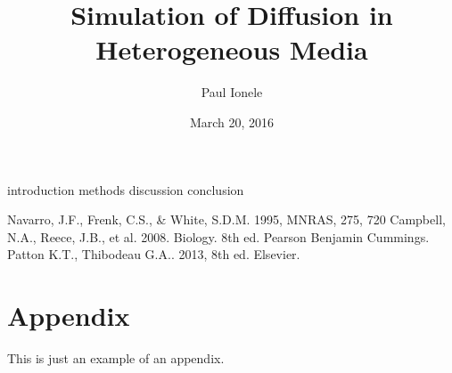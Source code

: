 \documentclass{jthesis}
\title{Simulation of Diffusion in Heterogeneous Media}
\date{March 20, 2016}
\author{Paul Ionele}
\begin{document}
\maketitle



\makedeclaration

\maketableofcontents

\doublespacing

{introduction}
{methods}
{discussion}
{conclusion}

\begin{thebibliography}{}

 Navarro, J.F., Frenk, C.S., \& White, S.D.M.  1995, MNRAS, 275, 720
 Campbell, N.A., Reece, J.B., et al. 2008. Biology. 8th ed. Pearson Benjamin Cummings.
 Patton K.T., Thibodeau G.A.. 2013, 8th ed. Elsevier.


\end{thebibliography}

\appendix

\chapter{Appendix}
\label{app:sample}
This is just an example of an appendix.
\end{document}
